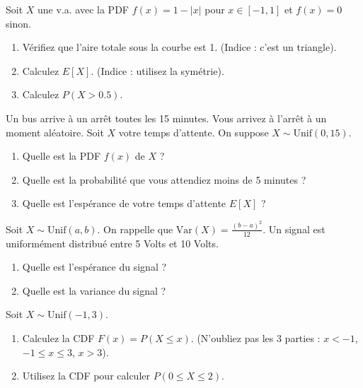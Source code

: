 \begin{exercicebox}
Soit $X$ une v.a. avec la PDF $f(x) = 1 - |x|$ pour $x \in [-1, 1]$ et $f(x)=0$ sinon.
\begin{enumerate}
    \item Vérifiez que l'aire totale sous la courbe est 1. (Indice : c'est un triangle).
    \item Calculez $E[X]$. (Indice : utilisez la symétrie).
    \item Calculez $P(X > 0.5)$.
\end{enumerate}
\end{exercicebox}


\begin{exercicebox}
Un bus arrive à un arrêt toutes les 15 minutes. Vous arrivez à l'arrêt à un moment aléatoire. Soit $X$ votre temps d'attente. On suppose $X \sim \text{Unif}(0, 15)$.
\begin{enumerate}
    \item Quelle est la PDF $f(x)$ de $X$ ?
    \item Quelle est la probabilité que vous attendiez moins de 5 minutes ?
    \item Quelle est l'espérance de votre temps d'attente $E[X]$ ?
\end{enumerate}
\end{exercicebox}

\begin{exercicebox}
Soit $X \sim \text{Unif}(a, b)$. On rappelle que $\text{Var}(X) = \frac{(b-a)^2}{12}$.
Un signal est uniformément distribué entre 5 Volts et 10 Volts.
\begin{enumerate}
    \item Quelle est l'espérance du signal ?
    \item Quelle est la variance du signal ?
\end{enumerate}
\end{exercicebox}

\begin{exercicebox}
Soit $X \sim \text{Unif}(-1, 3)$.
\begin{enumerate}
    \item Calculez la CDF $F(x) = P(X \le x)$. (N'oubliez pas les 3 parties : $x < -1$, $-1 \le x \le 3$, $x > 3$).
    \item Utilisez la CDF pour calculer $P(0 \le X \le 2)$.
\end{enumerate}
\end{exercicebox}

